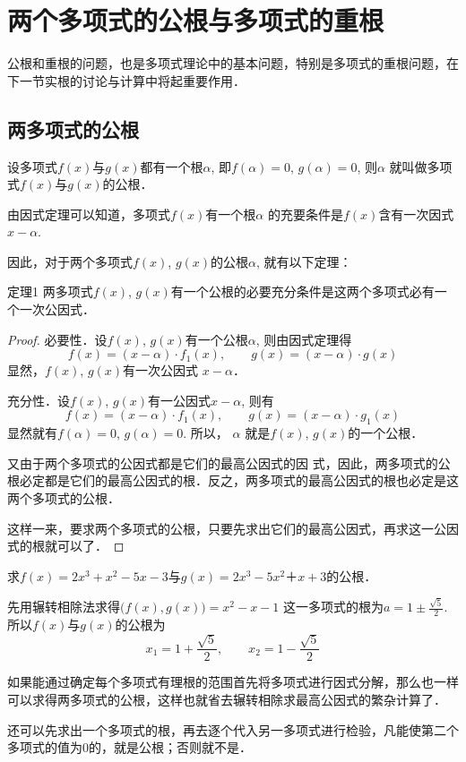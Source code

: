 \section{两个多项式的公根与多项式的重根}
公根和重根的问题，也是多项式理论中的基本问题，特别是多项式的重根问题，在下一节实根的讨论与计算中将起重要作用．

\subsection{两多项式的公根} 
设多项式$f(x)$与$g(x)$都有一个根$\alpha$, 即$f(\alpha )=0$, $g(\alpha )=0$, 则$\alpha$ 就叫做多项式$f(x)$与$g(x)$的公根．

由因式定理可以知道，多项式$f(x)$有一个根$\alpha$ 的充要条件是$f(x)$含有一次因式$x-\alpha$.

因此，对于两个多项式$f(x)$, $g(x)$的公根$\alpha$, 就有以下定理：

\begin{blk}{定理1}
    两多项式$f(x)$, $g(x)$有一个公根的必要充分条件是这两个多项式必有一个一次公因式．
\end{blk}

\begin{proof}
    必要性．设$f(x)$, $g(x)$有一个公根$\alpha$, 则由因式定理得
\[f (x) = (x-\alpha ) \cdot f_1 (x),\qquad g(x)=(x-\alpha )\cdot g (x)\]
显然，$f(x)$, $g(x)$有一次公因式 $x-\alpha$．

充分性．设$f(x)$, $g(x)$有一公因式$x-\alpha$, 则有
\[f (x) = (x-\alpha ) \cdot f_1 (x),\qquad g (x) = (x-\alpha ) \cdot g_1 (x)\]
显然就有$f(\alpha )=0$, $g(\alpha )=0$. 所以，
$\alpha$ 就是$f(x)$, $g(x)$的一个公根．

又由于两个多项式的公因式都是它们的最高公因式的因
式，因此，两多项式的公根必定都是它们的最高公因式的根．反之，两多项式的最高公因式的根也必定是这两个多项式的公根．

这样一来，要求两个多项式的公根，只要先求出它们的最高公因式，再求这一公因式的根就可以了．
\end{proof}

\begin{example}
    求$f(x)=2x^3+x^2-5x-3$与$g(x)=2x^3-5x^2＋x+3$的公根．
\end{example}

\begin{solution}
    先用辗转相除法求得$\big(f (x) ,g (x) \big) =x^2-x-1$
    这一多项式的根为$a=1\pm\frac{\sqrt{5}}{2}$. 所以$f(x)$与$g(x)$的公根为
\[x_1=1+\frac{\sqrt{5}}{2},\qquad x_2=1-\frac{\sqrt{5}}{2}\]
    
    如果能通过确定每个多项式有理根的范围首先将多项式进行因式分解，那么也一样可以求得两多项式的公根，这样也就省去辗转相除求最高公因式的繁杂计算了．

    还可以先求出一个多项式的根，再去逐个代入另一多项式进行检验，凡能使第二个多项式的值为0的，就是公根；否则就不是．
\end{solution}


